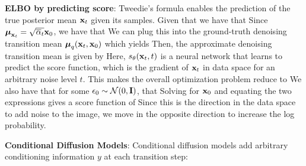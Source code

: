 \documentclass{article}
\begin{document}
  \textbf{ELBO by predicting score}: Tweedie's formula enables the prediction of the true posterior mean $\mathbf{x}_t$ given its samples. Given that
    we have that 
    Since $\boldsymbol{\mu}_{\mathbf{x}_t}=\sqrt{\overline{\alpha}_t}\mathbf{x}_0$, we have that
    We can plug this into the ground-truth denoising transition mean $\boldsymbol{\mu}_q(\mathbf{x}_t,\mathbf{x}_0)$ which yields
    Then, the approximate denoising transition mean is given by
    Here, $s_\theta(\mathbf{x}_t,t)$ is a neural network that learns to predict the score function, which is the gradient of $\mathbf{x}_t$ in data space for an arbitrary noise level $t$. This makes the overall optimization problem reduce to 
    We also have that for some $\mathbf{\epsilon}_0\sim\mathcal{N}(0,\mathbf{I})$, that
    Solving for $\mathbf{x}_0$ and equating the two expressions gives a score function of
    Since this is the direction in the data space to add noise to the image, we move in the opposite direction to increase the log probability.


  \textbf{Conditional Diffusion Models}: Conditional diffusion models add arbitrary conditioning information $y$ at each transition step:
\end{document}
